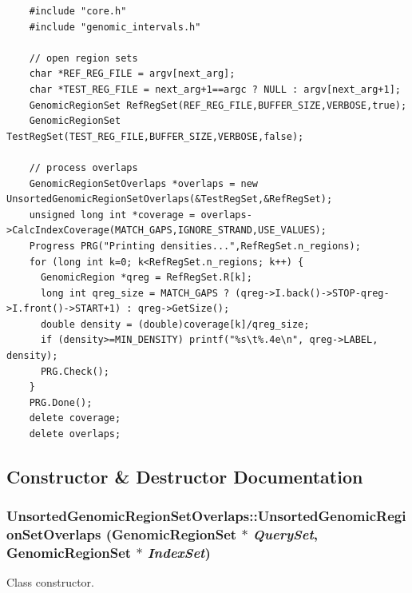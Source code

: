 \begin{Code}\begin{verbatim}    #include "core.h"
    #include "genomic_intervals.h"
    
    // open region sets
    char *REF_REG_FILE = argv[next_arg];
    char *TEST_REG_FILE = next_arg+1==argc ? NULL : argv[next_arg+1];
    GenomicRegionSet RefRegSet(REF_REG_FILE,BUFFER_SIZE,VERBOSE,true);
    GenomicRegionSet TestRegSet(TEST_REG_FILE,BUFFER_SIZE,VERBOSE,false);

    // process overlaps
    GenomicRegionSetOverlaps *overlaps = new UnsortedGenomicRegionSetOverlaps(&TestRegSet,&RefRegSet);
    unsigned long int *coverage = overlaps->CalcIndexCoverage(MATCH_GAPS,IGNORE_STRAND,USE_VALUES); 
    Progress PRG("Printing densities...",RefRegSet.n_regions);
    for (long int k=0; k<RefRegSet.n_regions; k++) {
      GenomicRegion *qreg = RefRegSet.R[k];
      long int qreg_size = MATCH_GAPS ? (qreg->I.back()->STOP-qreg->I.front()->START+1) : qreg->GetSize();
      double density = (double)coverage[k]/qreg_size;
      if (density>=MIN_DENSITY) printf("%s\t%.4e\n", qreg->LABEL, density);
      PRG.Check();
    }
    PRG.Done();
    delete coverage;
    delete overlaps;
\end{verbatim}
\end{Code}

 

\subsection{Constructor \& Destructor Documentation}
\hypertarget{classUnsortedGenomicRegionSetOverlaps_6a1255dfaac34080fae7880981b47acb}{
\subsubsection[UnsortedGenomicRegionSetOverlaps]{\setlength{\rightskip}{0pt plus 5cm}UnsortedGenomicRegionSetOverlaps::UnsortedGenomicRegionSetOverlaps ({\bf GenomicRegionSet} $\ast$ {\em QuerySet}, \/  {\bf GenomicRegionSet} $\ast$ {\em IndexSet})}}
\label{classUnsortedGenomicRegionSetOverlaps_6a1255dfaac34080fae7880981b47acb}


Class constructor. 

